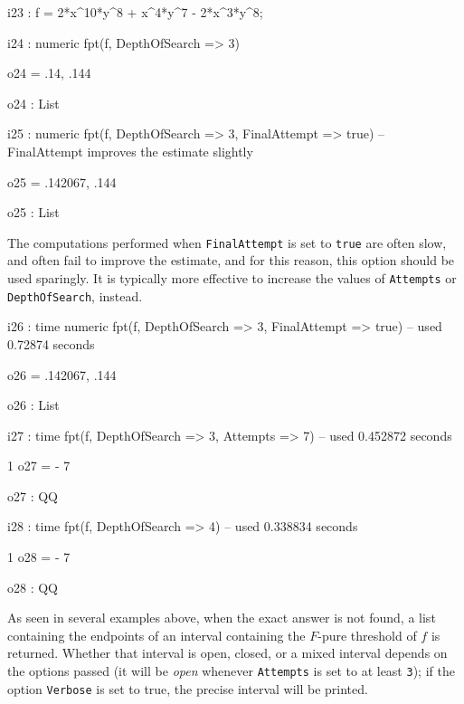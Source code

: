 \documentclass{amsart}
\begin{document}
\smallskip
{\small
{}
\begin{MyVerbatim}
i23 : f = 2*x^10*y^8 + x^4*y^7 - 2*x^3*y^8;

i24 : numeric fpt(f, DepthOfSearch => 3)

o24 = {.14, .144}

o24 : List

i25 : numeric fpt(f, DepthOfSearch => 3, FinalAttempt => true)
      -- FinalAttempt improves the estimate slightly

o25 = {.142067, .144}

o25 : List
\end{MyVerbatim}
}
\smallskip

The computations performed when \texttt{FinalAttempt} is set to \texttt{true} are often slow, and often fail to improve the estimate, and for this reason, this option should be used sparingly.
It is typically more effective to increase the values of \texttt{Attempts} or \texttt{DepthOfSearch}, instead.

\smallskip
{\small
{}
\begin{MyVerbatim}
i26 : time numeric fpt(f, DepthOfSearch => 3, FinalAttempt => true)
     -- used 0.72874 seconds

o26 = {.142067, .144}

o26 : List

i27 : time fpt(f, DepthOfSearch => 3, Attempts => 7) 
     -- used 0.452872 seconds

      1
o27 = -
      7

o27 : QQ

i28 : time fpt(f, DepthOfSearch => 4) 
     -- used 0.338834 seconds

      1
o28 = -
      7

o28 : QQ
\end{MyVerbatim}
}
\smallskip

As seen in several examples above, when the exact answer is not found, a list containing the endpoints of an interval containing the $F$-pure threshold of $f$ is returned.
Whether that interval is open, closed, or a mixed interval depends on the options passed (it will be \emph{open} whenever \texttt{Attempts} is set to at least \texttt{3}); if the option \texttt{Verbose} is set to true, the precise interval will be printed.
\end{document}
